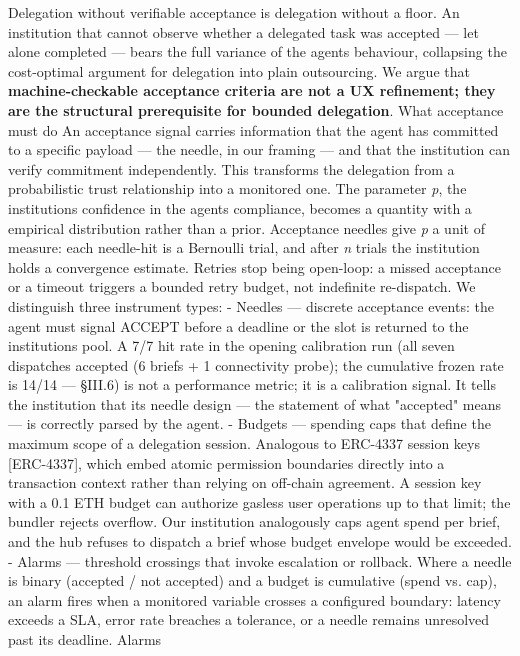 \documentclass[
]{article}
\begin{document}
Delegation without verifiable acceptance is delegation without a floor.
An institution that cannot observe whether a delegated task was accepted
--- let alone completed --- bears the full variance of the
agent\textquotesingle s behaviour, collapsing the cost-optimal argument
for delegation into plain outsourcing. We argue that
\textbf{machine-checkable acceptance criteria are not a UX refinement;
they are the structural prerequisite for bounded delegation}. What
acceptance must do An acceptance signal carries information that the
agent has committed to a specific payload --- the needle, in our framing
--- and that the institution can verify commitment independently. This
transforms the delegation from a probabilistic trust relationship into a
monitored one. The parameter \emph{p}, the institution\textquotesingle s
confidence in the agent\textquotesingle s compliance, becomes a quantity
with a empirical distribution rather than a prior. Acceptance needles
give \emph{p} a unit of measure: each needle-hit is a Bernoulli trial,
and after \emph{n} trials the institution holds a convergence estimate.
Retries stop being open-loop: a missed acceptance or a timeout triggers
a bounded retry budget, not indefinite re-dispatch. We distinguish three
instrument types: - Needles --- discrete acceptance events: the agent
must signal ACCEPT before a deadline or the slot is returned to the
institution\textquotesingle s pool. A 7/7 hit rate in the opening
calibration run (all seven dispatches accepted (6 briefs + 1
connectivity probe); the cumulative frozen rate is 14/14 --- §III.6) is
not a performance metric; it is a calibration signal. It tells the
institution that its needle design --- the statement of what "accepted"
means --- is correctly parsed by the agent. - Budgets --- spending caps
that define the maximum scope of a delegation session. Analogous to
ERC-4337 session keys {[}ERC-4337{]}, which embed atomic permission
boundaries directly into a transaction context rather than relying on
off-chain agreement. A session key with a 0.1 ETH budget can authorize
gasless user operations up to that limit; the bundler rejects overflow.
Our institution analogously caps agent spend per brief, and the hub
refuses to dispatch a brief whose budget envelope would be exceeded. -
Alarms --- threshold crossings that invoke escalation or rollback. Where
a needle is binary (accepted / not accepted) and a budget is cumulative
(spend vs. cap), an alarm fires when a monitored variable crosses a
configured boundary: latency exceeds a SLA, error rate breaches a
tolerance, or a needle remains unresolved past its deadline. Alarms
\end{document}
